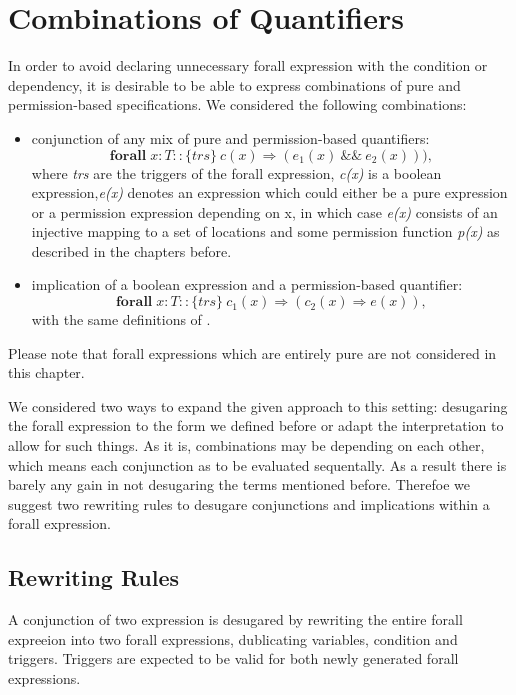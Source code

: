 \documentclass[12pt]{article}
\begin{document}
\section{Combinations of Quantifiers}
In order to avoid declaring unnecessary forall expression with the condition or dependency, it is desirable to be able to express combinations of pure and permission-based specifications. We considered the following combinations:
\begin{itemize}
\item conjunction of any mix of pure and permission-based quantifiers:
\begin{equation}
	\mathbf{forall} \; x:T :: \{trs\}\  c(x) \Rightarrow (e_1(x)\ \&\& \ e_2(x))),
\end{equation}
where {\it trs} are the triggers of the forall expression, {\it c(x)} is  a boolean expression,{\it e(x)} denotes an expression which could either be a pure expression or a permission expression depending on x, in which case {\it e(x)} consists of an injective mapping to a set of locations and some permission function {\it p(x)} as described in the chapters before.

\item implication of a boolean expression and a permission-based quantifier:
\begin{equation}
	\mathbf{forall} \; x:T ::  \{trs\}\ c_1(x) \Rightarrow (c_2(x) \Rightarrow e(x)),
\end{equation}
with the same definitions of .
\end{itemize}

Please note that forall expressions which are entirely pure are not considered in this chapter.


We considered two ways to expand the given approach to this setting: desugaring the forall expression to the form we defined before or adapt the interpretation to allow for such things. As it is, combinations may be depending on each other, which means each conjunction as to be evaluated sequentally. As a result there is barely any gain in not desugaring the terms mentioned before. Therefoe we suggest two rewriting rules to desugare conjunctions and implications within a forall expression.

\subsection{Rewriting Rules}
A conjunction of two expression is desugared by rewriting the entire forall expreeion into two forall expressions, dublicating variables, condition and triggers. Triggers are expected to be valid for both newly generated forall expressions.
\end{document}
